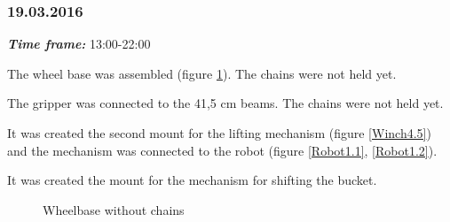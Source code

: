 \subsubsection{19.03.2016}
\textit{\textbf{Time frame:}} 13:00-22:00 

The wheel base was assembled (figure \ref{Wheelbase4.1}). The chains were not held yet.

The gripper was connected to the 41,5 cm beams. The chains were not held yet.

It was created the second mount for the lifting mechanism (figure \ref{Winch4.5}) and the mechanism was connected to the robot (figure \ref{Robot1.1}, \ref{Robot1.2}).

It was created the mount for the mechanism for shifting the bucket. 

\begin{figure}[H]
	\begin{minipage}[h]{0.47\linewidth}
		\caption{Wheelbase without chains}
		\label{Wheelbase4.1}
	\end{minipage}
	\hfill
	\begin{minipage}[h]{0.47\linewidth}

\end{minipage}
\end{figure}
